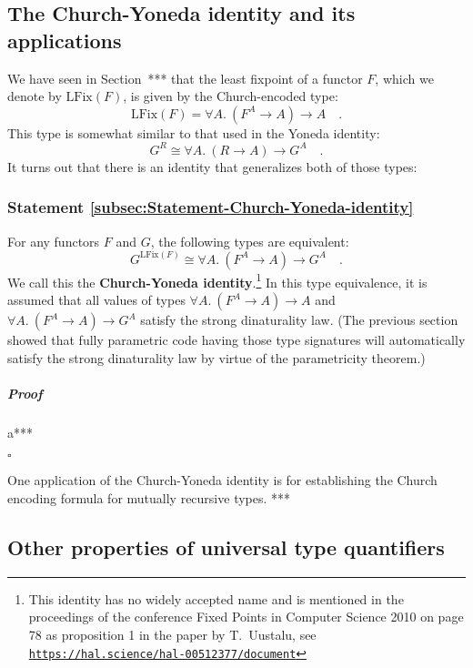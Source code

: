 \subsection{The Church-Yoneda identity and its applications}

We have seen in Section~{*}{*}{*} that the least fixpoint of a functor
$F$, which we denote by $\text{LFix}(F)$, is given by the Church-encoded
type:
\[
\text{LFix}(F)=\forall A.\ (F^{A}\rightarrow A)\rightarrow A\quad.
\]
This type is somewhat similar to that used in the Yoneda identity:
\[
G^{R}\cong\forall A.\ (R\rightarrow A)\rightarrow G^{A}\quad.
\]
It turns out that there is an identity that generalizes both of those
types:

\subsubsection{Statement \label{subsec:Statement-Church-Yoneda-identity}\ref{subsec:Statement-Church-Yoneda-identity}}

For any functors $F$ and $G$, the following types are equivalent:
\[
G^{\text{LFix}(F)}\cong\forall A.\ (F^{A}\rightarrow A)\rightarrow G^{A}\quad.
\]
We call this the \textbf{Church-Yoneda
identity}.\footnote{This identity has no widely accepted name and is mentioned in the
proceedings of the conference \textquotedbl Fixed Points in Computer
Science 2010\textquotedbl{} on page 78 as \textquotedbl proposition
1\textquotedbl{} in the paper by T.~Uustalu, see \texttt{\href{https://hal.science/hal-00512377/document}{https://hal.science/hal-00512377/document}}} In this type equivalence, it is assumed that all values of types
$\forall A.\ (F^{A}\rightarrow A)\rightarrow A$ and $\forall A.\ (F^{A}\rightarrow A)\rightarrow G^{A}$
satisfy the strong dinaturality law. (The previous section showed
that fully parametric code having those type signatures will automatically
satisfy the strong dinaturality law by virtue of the parametricity
theorem.)

\subparagraph{Proof}

a{*}{*}{*}

$\square$

One application of the Church-Yoneda identity is for establishing
the Church encoding formula for mutually recursive types. {*}{*}{*}

\subsection{Other properties of universal type quantifiers}

